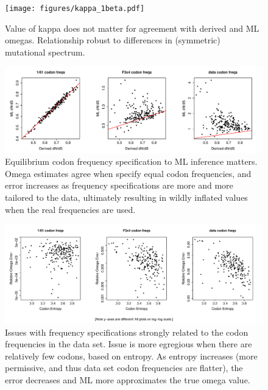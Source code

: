 \documentclass[11pt]{article}
\begin{document}
\begin{figure}[H]
\centerline{\texttt{[image: figures/kappa\_1beta.pdf]}}
\caption{\label{kappa} Value of kappa does not matter for agreement with derived and ML omegas. Relationship robust to differences in (symmetric) mutational spectrum.}
\end{figure}

\begin{figure}[H]
\centerline{\includegraphics[width=6in]{figures/freqspec_1beta.pdf}}
\caption{\label{freqspec_compare} Equilibrium codon frequency specification to ML inference matters. Omega estimates agree when specify equal codon frequencies, and error increases as frequency specifications are more and more tailored to the data, ultimately resulting in wildly inflated values when the real frequencies are used.}
\end{figure}

\begin{figure}[H]
\centerline{\includegraphics[width=6in]{figures/freqspec_entropy_error.pdf}}
\caption{\label{freqspec_compare} Issues with frequency specifications strongly related to the codon frequencies in the data set. Issue is more egregious when there are relatively few codons, based on entropy. As entropy increases (more permissive, and thus data set codon frequencies are flatter), the error decreases and ML more approximates the true omega value.}
\end{figure}
\end{document}
